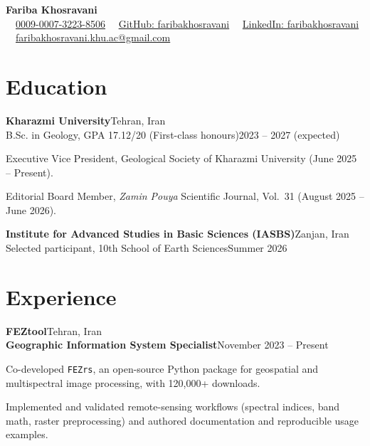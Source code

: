 \documentclass[11pt]{article}
\newcommand{\entry}[4]{%
  \textbf{#1}\hfill #2\\
  #3\hfill #4\par}
\begin{document}
\begin{center}
  {\LARGE\bfseries Fariba Khosravani}\\[4pt]
  \ \textbullet\
  \href{https://orcid.org/0009-0007-3223-8506}{0009-0007-3223-8506}
  \ \textbullet\
  \href{https://github.com/faribakhosravani}{GitHub: faribakhosravani}
  \ \textbullet\
  \href{https://www.linkedin.com/in/faribakhosravani}{LinkedIn: faribakhosravani}
  \ \textbullet\
    \href{mailto:faribakhosravani.khu.ac@gmail.com}{faribakhosravani.khu.ac@gmail.com}
\end{center}

\section*{Education}
\entry{Kharazmi University}{Tehran, Iran}
      {B.Sc. in Geology, GPA 17.12/20 (First-class honours)}{2023 -- 2027 (expected)}
\begin{cvitems}
  \item Executive Vice President, Geological Society of Kharazmi University (June 2025 -- Present).
  \item Editorial Board Member, \textit{Zamin Pouya} Scientific Journal, Vol.~31 (August 2025 -- June 2026).
\end{cvitems}

\vspace{5pt}
\entry{Institute for Advanced Studies in Basic Sciences (IASBS)}{Zanjan, Iran}
      {Selected participant, 10th School of Earth Sciences}{Summer 2026}

\section*{Experience}
\entry{FEZtool}{Tehran, Iran}
      {\textbf{Geographic Information System Specialist}}{November 2023 -- Present}
\begin{cvitems}
  \item Co-developed \texttt{FEZrs}, an open-source Python package for geospatial and multispectral
        image processing, with 120{,}000+ downloads.
  \item Implemented and validated remote-sensing workflows (spectral indices, band math,
        raster preprocessing) and authored documentation and reproducible usage examples.
\end{cvitems}
\end{document}
